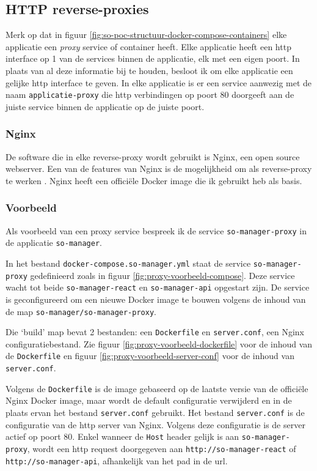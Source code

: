 \documentclass[a4paper,12pt]{report}
\begin{document}
\subsection{HTTP reverse-proxies}
Merk op dat in figuur \ref{fig:so-poc-structuur-docker-compose-containers} elke applicatie een \emph{proxy} service of container heeft.
Elke applicatie heeft een http interface op 1 van de services binnen de applicatie, elk met een eigen poort.
In plaats van al deze informatie bij te houden, besloot ik om elke applicatie een gelijke http interface te geven.
In elke applicatie is er een service aanwezig met de naam \lstinline|applicatie-proxy| die http verbindingen op poort 80 doorgeeft aan de juiste service binnen de applicatie op de juiste poort.

\subsubsection{Nginx}
De software die in elke reverse-proxy wordt gebruikt is Nginx, een open source webserver.
Een van de features van Nginx is de mogelijkheid om als reverse-proxy te werken \autocite{nginx:about}.
Nginx heeft een officiële Docker image die ik gebruikt heb als basis.

\subsubsection{Voorbeeld}
\label{sec:reverse-proxy-voorbeeld}
Als voorbeeld van een proxy service bespreek ik de service \lstinline|so-manager-proxy| in de applicatie \lstinline|so-manager|.

In het bestand \lstinline|docker-compose.so-manager.yml| staat de service \lstinline|so-manager-proxy| gedefinieerd zoals in figuur \ref{fig:proxy-voorbeeld-compose}.
Deze service wacht tot beide \lstinline|so-manager-react| en \lstinline|so-manager-api| opgestart zijn.
De service is geconfigureerd om een nieuwe Docker image te bouwen volgens de inhoud van de map \lstinline|so-manager/so-manager-proxy|.

Die `build' map bevat 2 bestanden: een \lstinline|Dockerfile| en \lstinline|server.conf|, een Nginx configuratiebestand.
Zie figuur \ref{fig:proxy-voorbeeld-dockerfile} voor de inhoud van de \lstinline|Dockerfile| en figuur \ref{fig:proxy-voorbeeld-server-conf} voor de inhoud van \lstinline|server.conf|.

Volgens de \lstinline|Dockerfile| is de image gebaseerd op de laatste versie van de officiële Nginx Docker image, maar wordt de default configuratie verwijderd en in de plaats ervan het bestand \lstinline|server.conf| gebruikt.
Het bestand \lstinline|server.conf| is de configuratie van de http server van Nginx.
Volgens deze configuratie is de server actief op poort 80.
Enkel wanneer de \lstinline|Host| header gelijk is aan \lstinline|so-manager-proxy|, wordt een http request doorgegeven aan \lstinline|http://so-manager-react| of \lstinline|http://so-manager-api|, afhankelijk van het pad in de url.
\end{document}
